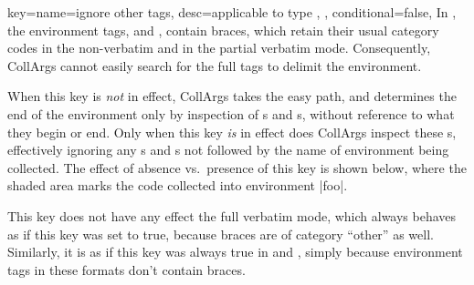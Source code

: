 \documentclass[a4paper,11pt]{article}
\begin{document}
\begin{doc}[
    pi=\docaux{cmd}{ifcollargsIgnoreOtherTags},
  ]{
    key={name=ignore other tags, desc={applicable to type ,{ }},
      conditional=false},
  }
  In , the environment tags,  and
  , contain braces, which retain their usual category codes
  in the non-verbatim and in the partial verbatim mode.  Consequently, CollArgs
  cannot easily search for the full tags to delimit the
  environment.

  When this key is \emph{not} in effect, CollArgs takes the easy path, and
  determines the end of the environment only by inspection of s and
    s, without reference to what  they begin or end.  Only
  when this key \emph{is} in effect does CollArgs inspect these s,
  effectively ignoring any s and s not followed by the name of
  environment being collected.  The effect of absence vs.\ presence of this key
  is shown below, where the shaded area marks the code collected into
  environment |foo|.

  \begin{tcbraster}
  \end{tcbraster}

  This key does not have any effect the full verbatim mode, which always
  behaves as if this key was set to true, because braces are of category
  ``other'' as well.  Similarly, it is as if this key was always true in
   and , simply because environment tags in
  these formats don't contain braces.
\end{doc}
\end{document}
